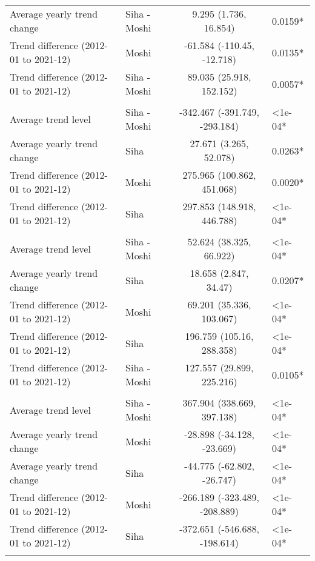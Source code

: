 \begin{longtable}{l|lcl}
Average yearly trend change & Siha - Moshi & 9.295 (1.736, 16.854) & 0.0159* \\ 
Trend difference (2012-01 to 2021-12) & Moshi & -61.584 (-110.45, -12.718) & 0.0135* \\ 
Trend difference (2012-01 to 2021-12) & Siha - Moshi & 89.035 (25.918, 152.152) & 0.0057* \\ 
\midrule\addlinespace[2.5pt]
\multicolumn{4}{l}{Hypertension} \\[2.5pt] 
\midrule\addlinespace[2.5pt]
Average trend level & Siha - Moshi & -342.467 (-391.749, -293.184) & <1e-04* \\ 
Average yearly trend change & Siha & 27.671 (3.265, 52.078) & 0.0263* \\ 
Trend difference (2012-01 to 2021-12) & Moshi & 275.965 (100.862, 451.068) & 0.0020* \\ 
Trend difference (2012-01 to 2021-12) & Siha & 297.853 (148.918, 446.788) & <1e-04* \\ 
\midrule\addlinespace[2.5pt]
\multicolumn{4}{l}{Infectious Eye Disease} \\[2.5pt] 
\midrule\addlinespace[2.5pt]
Average trend level & Siha - Moshi & 52.624 (38.325, 66.922) & <1e-04* \\ 
Average yearly trend change & Siha & 18.658 (2.847, 34.47) & 0.0207* \\ 
Trend difference (2012-01 to 2021-12) & Moshi & 69.201 (35.336, 103.067) & <1e-04* \\ 
Trend difference (2012-01 to 2021-12) & Siha & 196.759 (105.16, 288.358) & <1e-04* \\ 
Trend difference (2012-01 to 2021-12) & Siha - Moshi & 127.557 (29.899, 225.216) & 0.0105* \\ 
\midrule\addlinespace[2.5pt]
\multicolumn{4}{l}{Intestinal Worms} \\[2.5pt] 
\midrule\addlinespace[2.5pt]
Average trend level & Siha - Moshi & 367.904 (338.669, 397.138) & <1e-04* \\ 
Average yearly trend change & Moshi & -28.898 (-34.128, -23.669) & <1e-04* \\ 
Average yearly trend change & Siha & -44.775 (-62.802, -26.747) & <1e-04* \\ 
Trend difference (2012-01 to 2021-12) & Moshi & -266.189 (-323.489, -208.889) & <1e-04* \\ 
Trend difference (2012-01 to 2021-12) & Siha & -372.651 (-546.688, -198.614) & <1e-04* \\ 
\midrule\addlinespace[2.5pt]
\multicolumn{4}{l}{Leprosy} \\[2.5pt] 

\end{longtable}
